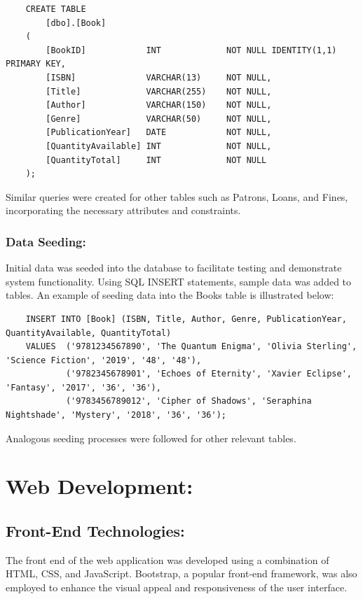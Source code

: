 \documentclass[12pt,titlepage,a4paper]{report}
\begin{document}
\begin{verbatim}
    CREATE TABLE
        [dbo].[Book]
    (
        [BookID]            INT             NOT NULL IDENTITY(1,1) PRIMARY KEY,
        [ISBN]              VARCHAR(13)     NOT NULL,
        [Title]             VARCHAR(255)    NOT NULL,
        [Author]            VARCHAR(150)    NOT NULL,
        [Genre]             VARCHAR(50)     NOT NULL,
        [PublicationYear]   DATE            NOT NULL,
        [QuantityAvailable] INT             NOT NULL,
        [QuantityTotal]     INT             NOT NULL
    );
\end{verbatim}
\noindent
Similar queries were created for other tables such as Patrons, Loans, and Fines, incorporating the necessary attributes and constraints.

\subsubsection{Data Seeding:}
\noindent
Initial data was seeded into the database to facilitate testing and demonstrate system functionality. Using SQL INSERT statements, sample data was added to tables. An example of seeding data into the Books table is illustrated below:

\begin{verbatim}
    INSERT INTO [Book] (ISBN, Title, Author, Genre, PublicationYear, QuantityAvailable, QuantityTotal)
    VALUES  ('9781234567890', 'The Quantum Enigma', 'Olivia Sterling', 'Science Fiction', '2019', '48', '48'),
            ('9782345678901', 'Echoes of Eternity', 'Xavier Eclipse', 'Fantasy', '2017', '36', '36'),
            ('9783456789012', 'Cipher of Shadows', 'Seraphina Nightshade', 'Mystery', '2018', '36', '36');
\end{verbatim}
\noindent
Analogous seeding processes were followed for other relevant tables.

\newpage

\section{Web Development:}

\subsection{Front-End Technologies:}
\noindent
The front end of the web application was developed using a combination of HTML, CSS, and JavaScript. Bootstrap, a popular front-end framework, was also employed to enhance the visual appeal and responsiveness of the user interface.
\end{document}
